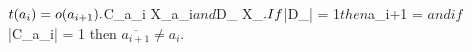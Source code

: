 \documentclass[preview]{standalone}
\begin{document}
$t(a_i) = o(a_{i+1}).\\$C_{a_i} \subseteq X_{a_i}$ and $D_{} \subseteq X_{}$.\\If $\left|D_{}\right| = 1$ then $a_{i+1} \not= $ and if $\left|C_{a_i}\right| = 1 then $\overline{a_{i+1}} \not= a_i$.\\
\end{document}
